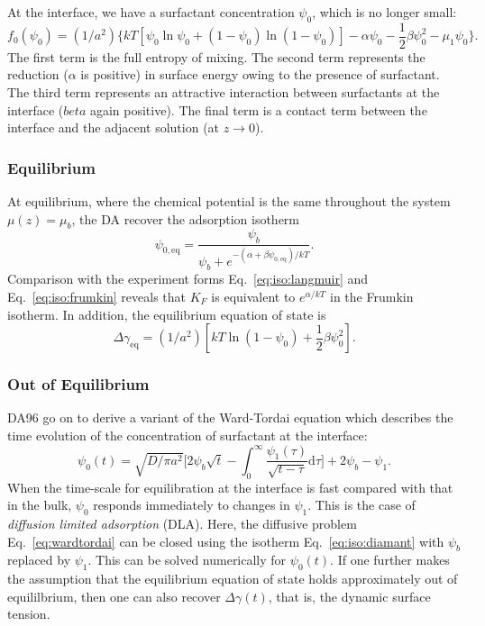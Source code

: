 At the interface, we have a surfactant concentration $\psi_0$, which
is no longer small:
\begin{equation}
f_0 (\psi_0) = (1/a^2) \big\{
kT [ \psi_0 \ln\psi_0 + (1 - \psi_0) \ln(1 - \psi_0)]
- \alpha\psi_0 - {\textstyle\frac{1}{2}}\beta\psi_0^2 - \mu_1\psi_0 \big\}.
\end{equation} 
The first term is the full entropy of mixing. The second term represents
the reduction ($\alpha$ is positive) in surface energy owing to the
presence of surfactant. The third term represents an attractive
interaction between surfactants at the interface ($beta$ again positive).
The final term is a contact term between the interface and the adjacent
solution (at $z\rightarrow 0$).

\subsubsection{Equilibrium}

At equilibrium, where the chemical potential is the same throughout
the system $\mu (z) = \mu_b$, the DA recover the adsorption isotherm
\begin{equation}
\psi_{0,\mathrm{eq}} = \frac{\psi_b}{\psi_b
+ e^{-(\alpha + \beta\psi_{0,\mathrm{eq}})/kT}}.
\label{eq:iso:diamant}
\end{equation}
Comparison with the experiment forms Eq.~\ref{eq:iso:langmuir} and
Eq.~\ref{eq:iso:frumkin} reveals that $K_F$ is equivalent to
$e^{\alpha /kT}$ in the Frumkin isotherm. In addition, the equilibrium
equation of state is
\begin{equation}
\Delta \gamma_{\mathrm{eq}} = (1/a^2) [ kT \ln (1 - \psi_0) 
+ {\textstyle\frac{1}{2}}\beta \psi_0^2 ].
\end{equation}

\subsubsection{Out of Equilibrium}

DA96 go on to derive a variant of the Ward-Tordai equation \cite{wardtordai}
which describes the time evolution of the concentration of surfactant
at the interface:
\begin{equation}
\psi_0 (t) = \sqrt{D/\pi a^2}
\Bigg[ 2\psi_b \sqrt{t} 
- \int_0^\infty \frac{\psi_1 (\tau)}{\sqrt{t - \tau}} \mathrm{d}\tau \Bigg]
+ 2\psi_b - \psi_1.
\label{eq:wardtordai}
\end{equation}
When the time-scale for equilibration at the interface is fast compared
with that in the bulk, $\psi_0$ responds immediately to changes in
$\psi_1$. This is the case of \textit{diffusion limited adsorption} (DLA).
Here, the diffusive problem Eq.~\ref{eq:wardtordai} can be closed
using the isotherm Eq.~\ref{eq:iso:diamant} with $\psi_b$ replaced by
$\psi_1$. This can be solved numerically for $\psi_0 (t)$. If one further
makes the assumption that the equilibrium equation of state holds
approximately out of equililbrium, then one can also recover
$\Delta\gamma (t)$, that is, the dynamic surface tension.

